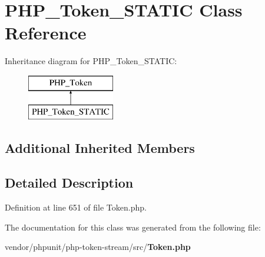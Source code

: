 \section{P\+H\+P\+\_\+\+Token\+\_\+\+S\+T\+A\+T\+I\+C Class Reference}
\label{class_p_h_p___token___s_t_a_t_i_c}
Inheritance diagram for P\+H\+P\+\_\+\+Token\+\_\+\+S\+T\+A\+T\+I\+C\+:\begin{figure}[H]
\begin{center}
\leavevmode
\includegraphics[height=2.000000cm]{class_p_h_p___token___s_t_a_t_i_c}
\end{center}
\end{figure}
\subsection*{Additional Inherited Members}


\subsection{Detailed Description}


Definition at line 651 of file Token.\+php.



The documentation for this class was generated from the following file\+:\begin{DoxyCompactItemize}
\item 
vendor/phpunit/php-\/token-\/stream/src/{\bf Token.\+php}\end{DoxyCompactItemize}
